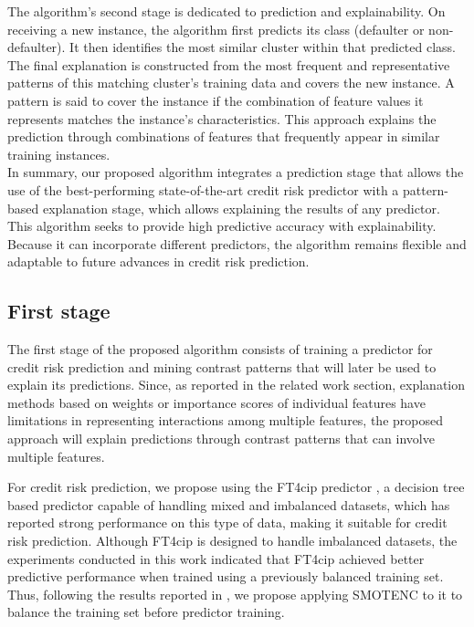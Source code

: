 {        The algorithm's second stage is dedicated to prediction and explainability. On receiving a new instance, the algorithm first predicts its class (defaulter or non-defaulter). It then identifies the most similar cluster within that predicted class. The final explanation is constructed from the most frequent and representative patterns of this matching cluster's training data and covers the new instance. A pattern is said to cover the instance if the combination of feature values it represents matches the instance’s characteristics. This approach explains the prediction through combinations of features that frequently appear in similar training instances.\\
    
        In summary, our proposed algorithm integrates a prediction stage that allows the use of the best-performing state-of-the-art credit risk predictor with a pattern-based explanation stage, which allows explaining the results of any predictor. This algorithm seeks to provide high predictive accuracy with explainability. Because it can incorporate different predictors, the algorithm remains flexible and adaptable to future advances in credit risk prediction.\\
}

\subsection{First stage}
{\color{blue}
	The first stage of the proposed algorithm consists of training a predictor for credit risk prediction and mining contrast patterns that will later be used to explain its predictions. Since, as reported in the related work section, explanation methods based on weights or importance scores of individual features have limitations in representing interactions among multiple features, the proposed approach will explain predictions through contrast patterns that can involve multiple features. \newline
}

For credit risk prediction, we propose using the FT4cip predictor \cite{canete2022ft4cip}, a decision tree based predictor capable of handling mixed and imbalanced datasets, which has reported strong performance on this type of data, making it suitable for credit risk prediction. Although FT4cip is designed to handle imbalanced datasets, the experiments conducted in this work indicated that FT4cip achieved better predictive performance when trained using a previously balanced training set. Thus, following the results reported in \cite{melchor2025oversampling}, we propose applying SMOTENC \cite{chawla2002smote, mukherjee2021smote} to it to balance the training set before predictor training.\newline

